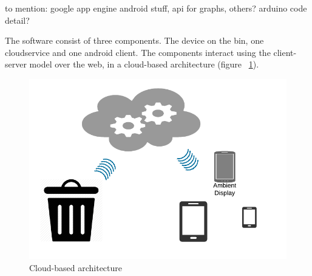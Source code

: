 to mention:
google app engine
android stuff, api for graphs, others?
arduino code detail?


The software consist of three components. The device on the bin, one cloudservice and one android client.
The components interact using the client-server model over the web, in a cloud-based architecture (figure ~\ref{fig:architecture}).

\begin{figure}
\centering
\includegraphics[scale=.6]{img/architecture}
\caption{Cloud-based architecture}
\label{fig:architecture}
\end{figure}

